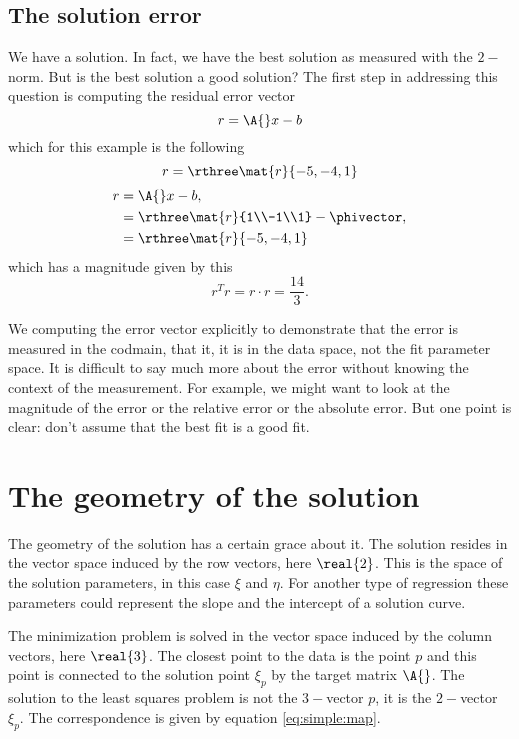 \subsection{The solution error}
We have a solution. In fact, we have the best solution as measured with the $2-$norm. But is the best solution a good solution? The first step in addressing this question is computing the residual error vector
\begin{equation}
  r = \A{}x-b
\end{equation}
which for this example is the following
\begin{equation}
  r = \rthree \mat{r}{-5,-4,1}
\end{equation}
\begin{equation}
  \begin{split}
     r &= \A{}x-b, \\
       &= \rthree \mat{r}{1\\-1\\1} - \phivector,\\
       &= \rthree \mat{r}{-5,-4,1}
  \end{split}
  \label{eq:soln:error}
\end{equation}
which has a magnitude given by this
\begin{equation}
  r^{T}r = r\cdot r = \frac{14}{3}.
\end{equation}

We computing the error vector explicitly to demonstrate that the error is measured in the codmain, that it, it is in the data space, not the fit parameter space. It is difficult to say much more about the error without knowing the context of the measurement. For example, we might want to look at the magnitude of the error or the relative error or the absolute error. But one point is clear: don't assume that the best fit is a good fit.

\section{The geometry of the solution}
The geometry of the solution has a certain grace about it. The solution resides in the vector space induced by the row vectors, here $\real{2}$. This is the space of the solution parameters, in this case $\xi$ and $\eta$. For another type of regression these parameters could represent the slope and the intercept of a solution curve.

The minimization problem is solved in the vector space induced by the column vectors, here $\real{3}$. The closest point to the data is the point $p$ and this point is connected to the solution point $\xi_{p}$ by the target matrix $\A{}$. The solution to the least squares problem is not the $3-$vector $p$, it is the $2-$vector $\xi_{p}$. The correspondence is given by equation \eqref{eq:simple:map}.

